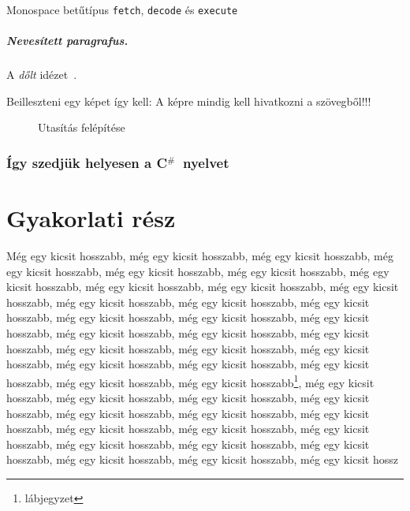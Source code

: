 \documentclass[a4paper,oneside,onecolumn,12pt]{LegrandOrangeBook}
\begin{document}
Monospace betűtípus \texttt{fetch}, \texttt{decode} és \texttt{execute}

\paragraph{Nevesített paragrafus.} A {\it dőlt}  idézet~\cite{Ubershaders:ARidiculous}.

Beilleszteni egy képet így kell: A képre mindig kell hivatkozni a szövegből!!!

\begin{figure}[ht]
    \centering
    
	\caption{Utasítás felépítése}
	\label{fig:Utasítás felépítése}
\end{figure}

\newcommand{\CS}{C${}^{\#}$}

\subsection{Így szedjük helyesen a \CS\ nyelvet}

\chapter{Gyakorlati rész}

Még egy kicsit hosszabb, még egy kicsit hosszabb, még egy kicsit hosszabb, még egy kicsit hosszabb, még egy kicsit hosszabb, még egy kicsit hosszabb, még egy kicsit hosszabb, még egy kicsit hosszabb, még egy kicsit hosszabb, még egy kicsit hosszabb, még egy kicsit hosszabb, még egy kicsit hosszabb, még egy kicsit hosszabb, még egy kicsit hosszabb, még egy kicsit hosszabb, még egy kicsit hosszabb, még egy kicsit hosszabb, még egy kicsit hosszabb, még egy kicsit hosszabb, még egy kicsit hosszabb, még egy kicsit hosszabb, még egy kicsit hosszabb, még egy kicsit hosszabb, még egy kicsit hosszabb, még egy kicsit hosszabb, még egy kicsit hosszabb, még egy kicsit hosszabb\footnote{lábjegyzet}, még egy kicsit hosszabb, még egy kicsit hosszabb, még egy kicsit hosszabb, még egy kicsit hosszabb, még egy kicsit hosszabb, még egy kicsit hosszabb, még egy kicsit hosszabb, még egy kicsit hosszabb, még egy kicsit hosszabb, még egy kicsit hosszabb, még egy kicsit hosszabb, még egy kicsit hosszabb, még egy kicsit hosszabb, még egy kicsit hosszabb, még egy kicsit hosszabb, még egy kicsit hossz

\end{document}
